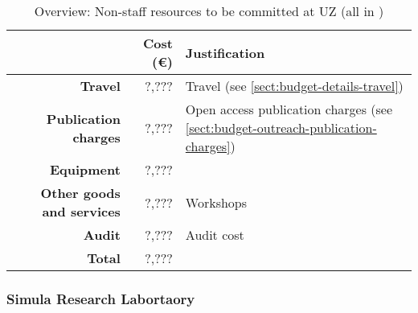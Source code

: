 \bigskip
\begin{table}[H]
\begin{tabular}{|r|r|p{9cm}|}
\hline
\textbf{} & \textbf{Cost (\euro)} & \textbf{Justification} \\\hline
\textbf{Travel} & ?,??? & Travel (see \ref{sect:budget-details-travel})\\\hline
\textbf{Publication charges} & ?,??? & Open access publication charges (see \ref{sect:budget-outreach-publication-charges})\\\hline
\textbf{Equipment} & ?,??? &  \\\hline    %

\textbf{Other goods and services} & ?,??? & Workshops \\\hline   %
\textbf{Audit} & ?,??? & Audit cost \\\hline
\textbf{Total} & ?,???\\\cline{1-2}
\end{tabular}
\caption{Overview: Non-staff resources to be committed at UZ (all in \texteuro)}\vspace*{-1em}
\end{table}




\subsubsection{Simula Research Labortaory}


